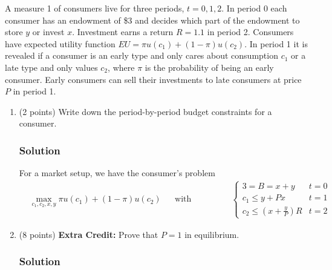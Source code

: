 \documentclass[12pt]{article}
\begin{document}
A measure 1 of consumers live for three periods, $t = 0, 1, 2$. In period 0 each consumer has an endowment of \$3 and decides which part of the endowment to store $y$ or invest $x$. Investment earns a return $R = 1.1$ in period 2. Consumers have expected utility function $EU = \pi u(c_1)+(1-\pi)u(c_2)$. In period 1 it is revealed if a consumer is an early type and only cares about consumption $c_1$ or a late type and only values $c_2$, where $\pi$ is the probability of being an early consumer. Early consumers can sell their investments to late consumers at price $P$ in period 1.

\begin{enumerate}[label=(\alph*)]
    \item (2 points) Write down the period-by-period budget constraints for a consumer.
    \subsubsection*{Solution}

    For a market setup, we have the consumer's problem 
    \begin{align*}
        &\max_{c_1, c_2, x,y} \pi u(c_1) + (1-\pi)u(c_2) && \text{with budget constraints:} && \begin{cases}
            3=B  =x+y & t=0
            \\ c_1 \leq y + Px & t=1
            \\ c_2 \leq \left(x + \frac{y}{P}\right)R & t=2
        \end{cases}
    \end{align*}

    \item (8 points) \textbf{Extra Credit:} Prove that $P = 1$ in equilibrium.
    \subsubsection*{Solution}


\end{enumerate}
\end{document}
